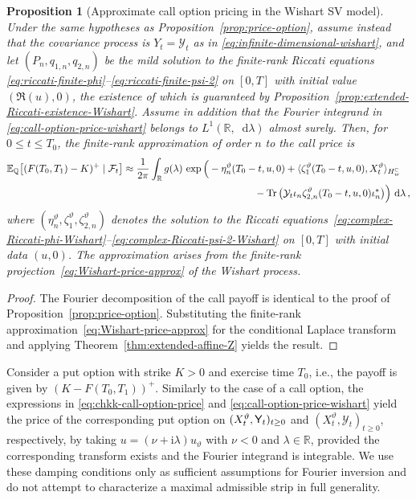 \documentclass[10pt,a4paper,reqno]{amsart}
\newcommand*\D{\mathop{}\!\mathrm{d}}
\DeclareMathOperator{\tr}{Tr}
\numberwithin{equation}{section}
\newtheorem{proposition}[theorem]{Proposition}
\theoremstyle{plain}
\theoremstyle{definition}
\theoremstyle{example}
\renewcommand{\MR}{\mathbb{R}}
\newcommand{\R}{\MR}
\newcommand{\cY}{\mathcal{Y}}
\begin{document}
\begin{proposition}[Approximate call option pricing in the Wishart SV model]\label{prop:price-option-wishart}
Under the same hypotheses as Proposition~\ref{prop:price-option}, assume instead that the covariance process is $Y_t=\mathcal{Y}_t$ as in \eqref{eq:infinite-dimensional-wishart}, and let $(P_n,q_{1,n},q_{2,n})$ be the mild solution to the finite-rank Riccati equations
\eqref{eq:riccati-finite-phi}--\eqref{eq:riccati-finite-psi-2} on $[0,T]$ with initial value $(\Re(u),0)$, the existence of which is guaranteed by Proposition~\ref{prop:extended-Riccati-existence-Wishart}.
Assume in addition that the Fourier integrand in \eqref{eq:call-option-price-wishart} belongs to $L^1(\mathbb R,\D\lambda)$ almost surely. Then, for $0\leq t\leq T_0$, the finite-rank approximation of order $n$ to the call price is
\begin{align}\label{eq:call-option-price-wishart}
\mathbb{E}_{\mathbb{Q}}\big[(F(T_0,T_1)-K)^+ \mid \mathcal{F}_t\big]
\approx \frac{1}{2\pi}\int_{\mathbb{R}}
g(\lambda)\,
\exp\Big(
& -\eta_n^{\vartheta}(T_0-t,u,0)
+ \langle \zeta_{1}^{\vartheta}(T_0-t,u,0), X_{t}^\vartheta\rangle_{H_w^{\mathbb{C}}} \nonumber\\
&\hspace{1.6cm}
- \tr\big( \mathcal{Y}_{t}\iota_n \zeta_{2,n}^{\vartheta}(T_0-t,u,0)\iota_n^*\big)
\Big)\,\D\lambda\,,
\end{align}
where $(\eta^{\vartheta}_n,\zeta_1^{\vartheta},\zeta_{2,n}^{\vartheta})$ denotes the solution to the Riccati equations~\eqref{eq:complex-Riccati-phi-Wishart}--\eqref{eq:complex-Riccati-psi-2-Wishart} on $[0,T]$ with initial data $(u,0)$.
The approximation arises from the finite-rank projection~\eqref{eq:Wishart-price-approx} of the Wishart process.
\end{proposition}
\begin{proof}
The Fourier decomposition of the call payoff is identical to the proof of Proposition~\ref{prop:price-option}. Substituting the finite-rank approximation~\eqref{eq:Wishart-price-approx} for the conditional Laplace transform and applying Theorem~\ref{thm:extended-affine-Z} yields the result.
\end{proof}

Consider a put option with strike $K>0$ and exercise time $T_0$, i.e., the payoff is given by $(K-F(T_0,T_1))^+$.
Similarly to the case of a call option, the expressions
 in \eqref{eq:chkk-call-option-price} and \eqref{eq:call-option-price-wishart} yield the price of the corresponding put option on $(X_t^\vartheta, {\sf Y}_t)_{t\geq 0}$ and $(X_t^\vartheta, \cY_t)_{t\geq 0}$, respectively, by taking $u =(\nu +\mathrm{i}\lambda) u_{\vartheta}$ with $\nu <0$ and $\lambda \in \R$, provided the corresponding transform exists and the Fourier integrand is integrable. We use these damping conditions only as sufficient assumptions for Fourier inversion and do not attempt to characterize a maximal admissible strip in full generality.
\end{document}
